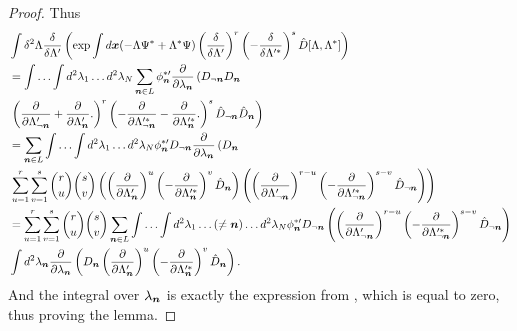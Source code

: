 \begin{proof}
Thus
\begin{equation*}
\begin{split}
	& \int \delta^2\Lambda
		\frac{\delta}{\delta \Lambda^\prime} \left(
			\exp \int d\boldsymbol{x} (-\Lambda \Psi^* + \Lambda^* \Psi)
			\left( \frac{\delta}{\delta \Lambda^\prime} \right)^r
			\left( -\frac{\delta}{\delta \Lambda^{\prime*}} \right)^s
			\hat{D}[\Lambda, \Lambda^*]
		\right) \\
	& = \int \ldots \int d^2\lambda_1 \ldots d^2\lambda_N
		\sum\limits_{\boldsymbol{n} \in L}
		\phi_{\boldsymbol{n}}^{*\prime}
		\frac{\partial}{\partial \lambda_{\boldsymbol{n}}} \left(
			D_{\lnot \boldsymbol{n}} D_{\boldsymbol{n}}
		\right.	\\
		& \left.
			\left(
				\frac{\partial}{\partial \Lambda_{\lnot \boldsymbol{n}}^\prime}
				+ \frac{\partial}{\partial \Lambda_{\boldsymbol{n}}^\prime}.
			\right)^r
			\left(
				-\frac{\partial}{\partial \Lambda_{\lnot \boldsymbol{n}}^{\prime*}}
				-\frac{\partial}{\partial \Lambda_{\boldsymbol{n}}^{\prime*}}.
			\right)^s
			\hat{D}_{\lnot \boldsymbol{n}} \hat{D}_{\boldsymbol{n}}
		\right) \\
	& = \sum\limits_{\boldsymbol{n} \in L} \int \ldots \int d^2\lambda_1 \ldots d^2\lambda_N
		\phi_{\boldsymbol{n}}^{*\prime} D_{\lnot \boldsymbol{n}}
		\frac{\partial}{\partial \lambda_{\boldsymbol{n}}} \left(
			D_{\boldsymbol{n}}
		\right.	\\
	& \left.
		\sum\limits_{u=1}^r \sum\limits_{v=1}^s \binom{r}{u} \binom{s}{v}
			\left(
				\left( \frac{\partial}{\partial \Lambda_{\boldsymbol{n}}^\prime} \right)^u
				\left( -\frac{\partial}{\partial \Lambda_{\boldsymbol{n}}^{\prime*}} \right)^v
				\hat{D}_{\boldsymbol{n}}
			\right)
			\left(
				\left( \frac{\partial}{\partial \Lambda_{\lnot \boldsymbol{n}}^\prime} \right)^{r-u}
				\left( -\frac{\partial}{\partial \Lambda_{\lnot \boldsymbol{n}}^{\prime*}} \right)^{s-v}
				\hat{D}_{\lnot \boldsymbol{n}}
			\right)
		\right) \\
	& = \sum\limits_{u=1}^r \sum\limits_{v=1}^s \binom{r}{u} \binom{s}{v}
		\sum\limits_{\boldsymbol{n} \in L}
		\int \ldots \int d^2\lambda_1 \ldots (\ne \boldsymbol{n}) \ldots d^2\lambda_N
		\phi_{\boldsymbol{n}}^{*\prime} D_{\lnot \boldsymbol{n}}
		\left(
			\left( \frac{\partial}{\partial \Lambda_{\lnot \boldsymbol{n}}^\prime} \right)^{r-u}
			\left( -\frac{\partial}{\partial \Lambda_{\lnot \boldsymbol{n}}^{\prime*}} \right)^{s-v}
			\hat{D}_{\lnot \boldsymbol{n}}
		\right) \\
	&	\int d^2\lambda_{\boldsymbol{n}} \frac{\partial}{\partial \lambda_{\boldsymbol{n}}} \left(
			D_{\boldsymbol{n}}
			\left( \frac{\partial}{\partial \Lambda_{\boldsymbol{n}}^\prime} \right)^u
			\left( -\frac{\partial}{\partial \Lambda_{\boldsymbol{n}}^{\prime*}} \right)^v
			\hat{D}_{\boldsymbol{n}}
		\right).
\end{split}
\end{equation*}
And the integral over $\lambda_{\boldsymbol{n}}$ is exactly the expression from ,
which is equal to zero,
thus proving the lemma.
\end{proof}

